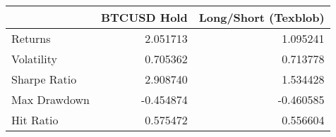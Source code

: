 \begin{tabular}{lrr}
\toprule
{} &  BTCUSD Hold &  Long/Short (Texblob) \\
\midrule
Returns      &     2.051713 &              1.095241 \\
Volatility   &     0.705362 &              0.713778 \\
Sharpe Ratio &     2.908740 &              1.534428 \\
Max Drawdown &    -0.454874 &             -0.460585 \\
Hit Ratio    &     0.575472 &              0.556604 \\
\bottomrule
\end{tabular}
